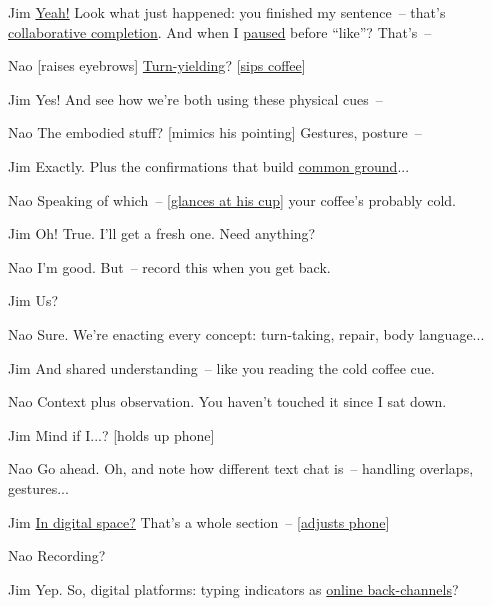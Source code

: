 \begin{sloppypar}
\begin{dialogue}
\item[Jim] \uline{Yeah!} Look what just happened: you finished my sentence~-- that's \uline{collaborative completion}. And when I \uline{paused} before ``like''? That's~-- 

\item[Nao] [raises eyebrows] \uline{Turn-yielding}? [\uline{sips coffee}]

\item[Jim] Yes! And see how we're both using these physical cues~-- 

\item[Nao] The embodied stuff? [mimics his pointing] Gestures, posture~-- 

\item[Jim] Exactly. Plus the confirmations that build \uline{common ground}...

\item[Nao] Speaking of which~-- [\uline{glances at his cup}] your coffee's probably cold.

\item[Jim] Oh! True. I'll get a fresh one. Need anything?

\item[Nao] I'm good. But~-- record this when you get back.

\item[Jim] Us?

\item[Nao] Sure. We're enacting every concept: turn-taking, repair, body language...

\item[Jim] And shared understanding~-- like you reading the cold coffee cue.

\item[Nao] Context plus observation. You haven't touched it since I sat down.

\item[Jim] Mind if I...? [holds up phone]

\item[Nao] Go ahead. Oh, and note how different text chat is~-- handling overlaps, gestures...

\item[Jim] \uline{In digital space?} That's a whole section~-- [\uline{adjusts phone}]

\item[Nao] Recording?

\item[Jim] Yep. So, digital platforms: typing indicators as \uline{online back-channels}?


\end{dialogue}
\end{sloppypar}
